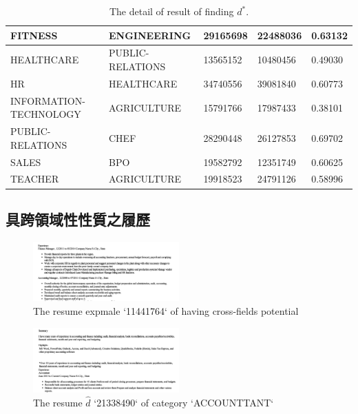 \documentclass[acmsmall]{acmart}
\begin{document}
\begin{table}[t]
{\begin{tabular}{|l|l|l|l|l|}
FITNESS                & ENGINEERING            & 29165698   & 22488036    & 0.63132 \\ \hline
HEALTHCARE             & PUBLIC-RELATIONS       & 13565152   & 10480456    & 0.49030 \\ \hline
HR                     & HEALTHCARE             & 34740556   & 39081840    & 0.60773 \\ \hline
INFORMATION-TECHNOLOGY & AGRICULTURE            & 15791766   & 17987433    & 0.38101 \\ \hline
PUBLIC-RELATIONS       & CHEF                   & 28290448   & 26127853    & 0.69702 \\ \hline
SALES                  & BPO                    & 19582792   & 12351749    & 0.60625 \\ \hline
TEACHER                & AGRICULTURE            & 19918523   & 24791126    & 0.58996 \\ \hline
\end{tabular}%
}
\caption{The detail of result of finding $d^{*}$.}
\label{table:1}
\end{table}


\subsection{具跨領域性性質之履歷}

\begin{figure}[t]
    \centerline{\includegraphics[width=0.5\textwidth]{cross_fields.png}}
    \caption{The resume expmale `11441764` of having cross-fields potential}
    \label{cross_fields}
\end{figure}

\begin{figure}[t]
    \centerline{\includegraphics[width=0.5\textwidth]{resume_d_hat.png}}
    \caption{The resume $\hat{d}$ `21338490` of category `ACCOUNTTANT`}
    \label{resume_d_hat}
\end{figure}
\end{document}
